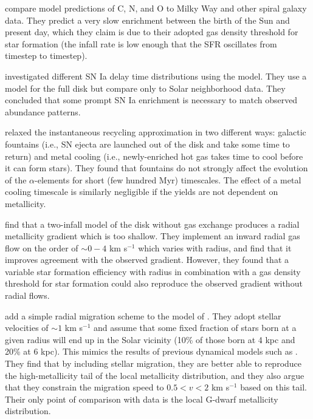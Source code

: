 \documentclass[twocolumn,twocolappendix,linenumbers]{aastex631}
\begin{document}
\citet{chiappini_oxygen_2003} compare model predictions of C, N, and O to Milky Way and other spiral galaxy data. They predict a very slow enrichment between the birth of the Sun and present day, which they claim is due to their adopted gas density threshold for star formation (the infall rate is low enough that the SFR oscillates from timestep to timestep).

\citet{matteucci_effect_2009} investigated different SN Ia delay time distributions using the \citep{chiappini_chemical_1997,chiappini_abundance_2001} model. They use a model for the full disk but compare only to Solar neighborhood data. They concluded that some prompt SN Ia enrichment is necessary to match observed abundance patterns.

\citet{spitoni_effects_2009} relaxed the instantaneous recycling approximation in two different ways: galactic fountains (i.e., SN ejecta are launched out of the disk and take some time to return) and metal cooling (i.e., newly-enriched hot gas takes time to cool before it can form stars). They found that fountains do not strongly affect the evolution of the $\alpha$-elements for short (few hundred Myr) timescales. The effect of a metal cooling timescale is similarly negligible if the yields are not dependent on metallicity.

\citet{spitoni_effects_2011} find that a two-infall model of the disk without gas exchange produces a radial metallicity gradient which is too shallow. They implement an inward radial gas flow on the order of $\sim0-4$ km s$^{-1}$ which varies with radius, and find that it improves agreement with the observed gradient. However, they found that a variable star formation efficiency with radius in combination with a gas density threshold for star formation could also reproduce the observed gradient without radial flows.

\citet{spitoni_effect_2015} add a simple radial migration scheme to the model of \citet{spitoni_effects_2011}. They adopt stellar velocities of $\sim 1$ km s$^{-1}$ and assume that some fixed fraction of stars born at a given radius will end up in the Solar vicinity (10\% of those born at 4 kpc and 20\% at 6 kpc). This mimics the results of previous dynamical models such as \citet{minchev_chemodynamical_2013}. They find that by including stellar migration, they are better able to reproduce the high-metallicity tail of the local metallicity distribution, and they also argue that they constrain the migration speed to $0.5 < v < 2$ km s$^{-1}$ based on this tail. Their only point of comparison with data is the local G-dwarf metallicity distribution.
\end{document}
